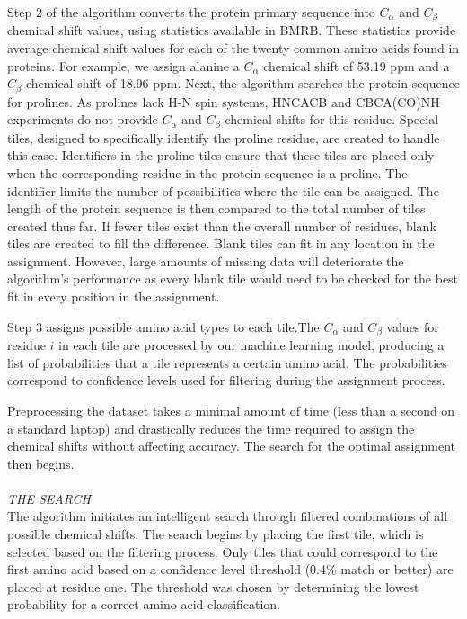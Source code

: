 \documentclass{article}
\begin{document}
\indent Step 2 of the algorithm converts the protein primary sequence into $C_{\alpha}$ and $C_{\beta}$ chemical shift values, using statistics available in BMRB. These statistics provide average chemical shift values for each of the twenty common amino acids found in proteins. For example, we assign alanine a $C_{\alpha}$ chemical shift of 53.19 ppm and a $C_{\beta}$ chemical shift of 18.96 ppm. Next, the algorithm searches the protein sequence for prolines. As prolines lack H-N spin systems, HNCACB and CBCA(CO)NH experiments do not provide $C_{\alpha}$ and $C_{\beta}$ chemical shifts for this residue. Special tiles, designed to specifically identify the proline residue, are created to handle this case. Identifiers in the proline tiles ensure that these tiles are placed only when the corresponding residue in the protein sequence is a proline. The identifier limits the number of possibilities where the tile can be assigned. The length of the protein sequence is then compared to the total number of tiles created thus far. If fewer tiles exist than the overall number of residues, blank tiles are created to fill the difference. Blank tiles can fit in any location in the assignment. However, large amounts of missing data will deteriorate the algorithm's performance as every blank tile would need to be checked for the best fit in every position in the assignment. 

\indent Step 3 assigns possible amino acid types to each tile.The $C_{\alpha}$ and $C_{\beta}$ values for residue $i$ in each tile are processed by our machine learning model, producing a list of probabilities that a tile represents a certain amino acid. The probabilities correspond to confidence levels used for filtering during the assignment process. 

\indent Preprocessing the dataset takes a minimal amount of time (less than a second on a standard laptop) and drastically reduces the time required to assign the chemical shifts without affecting accuracy. The search for the optimal assignment then begins. 
\\\\
\noindent\textit{THE SEARCH}\\
\indent The algorithm initiates an intelligent search through filtered combinations of all possible chemical shifts. The search begins by placing the first tile, which is selected based on the filtering process. Only tiles that could correspond to the first amino acid based on a confidence level threshold (0.4\% match or better) are placed at residue one. The threshold was chosen by determining the lowest probability for a correct amino acid classification.
\end{document}
